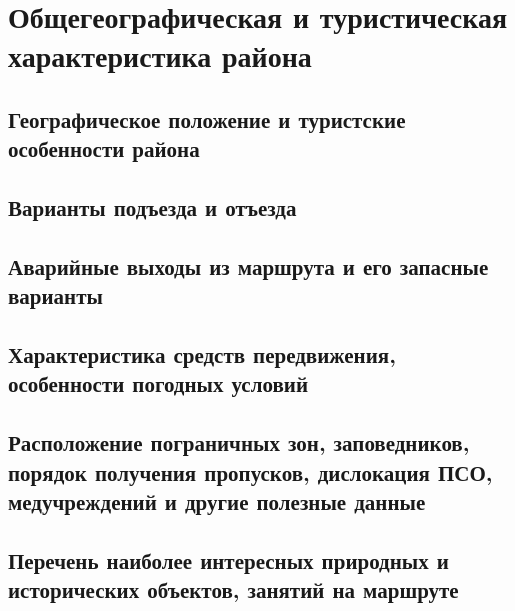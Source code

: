 \section{Общегеографическая и туристическая характеристика района}
\subsection{Географическое положение и туристские особенности района}
\subsection{Варианты подъезда и отъезда}
\subsection{Аварийные выходы из маршрута и его запасные варианты}
\subsection{Характеристика средств передвижения, особенности погодных условий} \subsection{Расположение пограничных зон, заповедников, порядок получения пропусков, дислокация ПСО, медучреждений и другие полезные данные}
\subsection{Перечень наиболее интересных природных и исторических объектов, занятий на маршруте}
\newpage